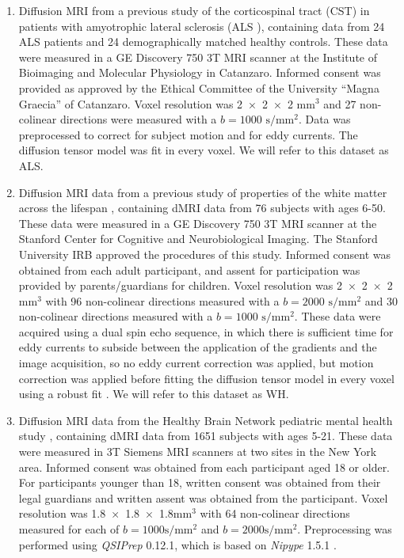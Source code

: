 \documentclass[10pt,letterpaper]{article}
\begin{document}
\begin{enumerate}

\item Diffusion MRI from a previous study of the corticospinal
tract (CST) in patients with amyotrophic lateral sclerosis
(ALS \cite{sarica2017corticospinal}), containing data from 24 ALS
patients and 24 demographically matched healthy controls. These data
were measured in a GE Discovery 750 3T MRI scanner at the Institute
of Bioimaging and Molecular Physiology in Catanzaro. Informed consent
was provided as approved by the Ethical Committee of the University
``Magna Graecia'' of Catanzaro. Voxel resolution was \num{2x2x2}
$\text{mm}^3$ and 27 non-colinear directions were measured with a
$b=1000$ $\text{s} / \text{mm}^2$. Data was preprocessed to
correct for subject motion and for eddy currents. The diffusion tensor
model \cite{basser1994mr} was fit in every voxel.
We will refer to this dataset as ALS.

\item Diffusion MRI data from a previous study of properties of
the white matter across the lifespan \cite{yeatman2014lifespan},
containing dMRI data from 76 subjects with ages 6-50. These data were
measured in a GE Discovery 750 3T MRI scanner at the Stanford Center
for Cognitive and Neurobiological Imaging. The Stanford University
IRB approved the procedures of this study. Informed consent was
obtained from each adult participant, and assent for participation
was provided by parents/guardians for children. Voxel resolution was
\num{2x2x2}$\textrm{mm}^3$ with 96 non-colinear directions measured with a
$b=2000$ $\textrm{s} / \textrm{mm}^2$ and 30 non-colinear directions
measured with a $b=1000$ $\textrm{s} / \textrm{mm}^2$. These data
were acquired using a dual spin echo sequence, in which there is
sufficient time for eddy currents to subside between the application of
the gradients and the image acquisition, so no eddy current correction
was applied, but motion correction was applied before fitting the
diffusion tensor model \cite{basser1994mr} in every voxel using a robust
fit \cite{chang2005restore}
.
We will refer to this dataset as WH.

\item Diffusion MRI data from the Healthy Brain Network pediatric mental
health study \cite{alexander2017open}, containing dMRI data from 1651 subjects
with ages 5-21. These data were measured in 3T Siemens MRI scanners at two
sites in the New York
area.
Informed consent was obtained from each participant aged 18 or older. For
participants younger than 18, written consent was obtained from their legal
guardians and written assent was obtained from the participant. Voxel
resolution was \num{1.8x1.8x1.8}$\text{mm}^3$ with 64 non-colinear directions
measured for each of $b=1000 \text{s} / \text{mm}^2$ and $b=2000 \text{s} /
\text{mm}^2$. Preprocessing was performed using \emph{QSIPrep} 0.12.1, which
is based on \emph{Nipype} 1.5.1 \cite[RRID:SCR\_002502]{nipype1,nipype2}.


\end{enumerate}
\end{document}
